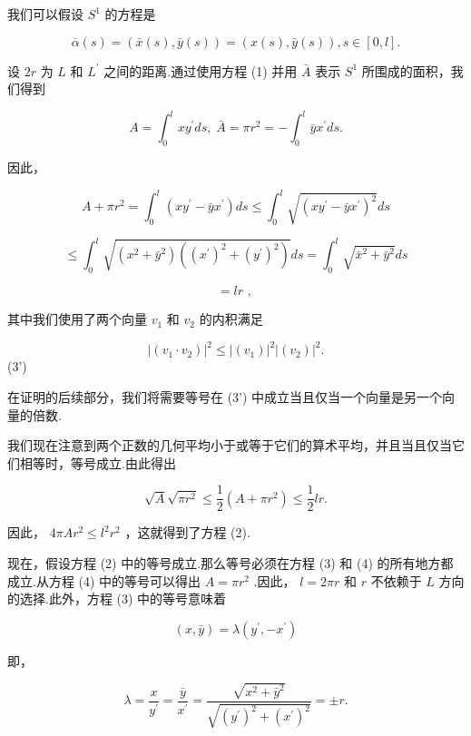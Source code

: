 我们可以假设 \({S}^{1}\) 的方程是

\[
\overline{\alpha }\left( s\right)  = \left( {\bar{x}\left( s\right) ,\bar{y}\left( s\right) }\right)  = \left( {x\left( s\right) ,\bar{y}\left( s\right) }\right) ,s \in  \left\lbrack  {0,l}\right\rbrack  .
\]

设 \({2r}\) 为 \(L\) 和 \({L}^{\prime }\) 之间的距离.通过使用方程 (1) 并用 \(\bar{A}\) 表示 \({S}^{1}\) 所围成的面积，我们得到

\[
A = {\int }_{0}^{l}x{y}^{\prime }{ds},\;\bar{A} = \pi {r}^{2} =  - {\int }_{0}^{l}\bar{y}{x}^{\prime }{ds}.
\]

因此，

\[
A + \pi {r}^{2} = {\int }_{0}^{l}\left( {x{y}^{\prime } - \bar{y}{x}^{\prime }}\right) {ds} \leq  {\int }_{0}^{l}\sqrt{{\left( x{y}^{\prime } - \bar{y}{x}^{\prime }\right) }^{2}}{ds}
\]

\[
\leq  {\int }_{0}^{l}\sqrt{\left( {{x}^{2} + {\bar{y}}^{2}}\right) \left( {{\left( {x}^{\prime }\right) }^{2} + {\left( {y}^{\prime }\right) }^{2}}\right) }{ds} = {\int }_{0}^{l}\sqrt{{\bar{x}}^{2} + {\bar{y}}^{2}}{ds} \tag{3}
\]

\[
= {lr}\text{ , }
\]

其中我们使用了两个向量 \({v}_{1}\) 和 \({v}_{2}\) 的内积满足

\[
{\left| \left( {v}_{1} \cdot  {v}_{2}\right) \right| }^{2} \leq  {\left| \left( {v}_{1}\right) \right| }^{2}{\left| \left( {v}_{2}\right) \right| }^{2}.
\]
 (3')

在证明的后续部分，我们将需要等号在 (3') 中成立当且仅当一个向量是另一个向量的倍数.

我们现在注意到两个正数的几何平均小于或等于它们的算术平均，并且当且仅当它们相等时，等号成立.由此得出

\[
\sqrt{A}\sqrt{\pi {r}^{2}} \leq  \frac{1}{2}\left( {A + \pi {r}^{2}}\right)  \leq  \frac{1}{2}{lr}. \tag{4}
\]

因此， \({4\pi A}{r}^{2} \leq  {l}^{2}{r}^{2}\) ，这就得到了方程 (2).

现在，假设方程 (2) 中的等号成立.那么等号必须在方程 (3) 和 (4) 的所有地方都成立.从方程 (4) 中的等号可以得出 \(A = \pi {r}^{2}\) .因此， \(l = {2\pi r}\) 和 \(r\) 不依赖于 \(L\) 方向的选择.此外，方程 (3) 中的等号意味着

\[
\left( {x,\bar{y}}\right)  = \lambda \left( {{y}^{\prime }, - {x}^{\prime }}\right)
\]

即，

\[
\lambda  = \frac{x}{{y}^{\prime }} = \frac{\bar{y}}{{x}^{\prime }} = \frac{\sqrt{{x}^{2} + {\bar{y}}^{2}}}{\sqrt{{\left( {y}^{\prime }\right) }^{2} + {\left( {x}^{\prime }\right) }^{2}}} =  \pm  r.
\]

